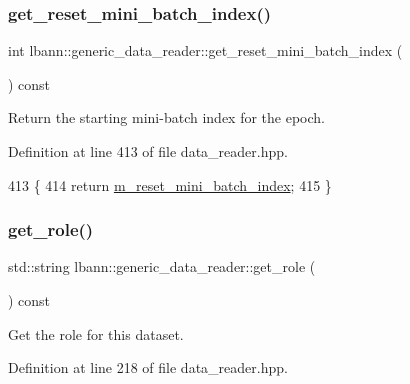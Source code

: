 \subsubsection{\texorpdfstring{get\+\_\+reset\+\_\+mini\+\_\+batch\+\_\+index()}{get\_reset\_mini\_batch\_index()}}
{\footnotesize\ttfamily int lbann\+::generic\+\_\+data\+\_\+reader\+::get\+\_\+reset\+\_\+mini\+\_\+batch\+\_\+index (\begin{DoxyParamCaption}{ }\end{DoxyParamCaption}) const\hspace{0.3cm}{\ttfamily [inline]}}



Return the starting mini-\/batch index for the epoch. 



Definition at line 413 of file data\+\_\+reader.\+hpp.


\begin{DoxyCode}
413                                          \{
414     \textcolor{keywordflow}{return} \hyperlink{classlbann_1_1generic__data__reader_af29f62579a408d1548a124442bcf181d}{m\_reset\_mini\_batch\_index};
415   \}
\end{DoxyCode}
\mbox{\label{classlbann_1_1generic__data__reader_a92982e1b399f37e2ead5aa440883cba5}} 
\subsubsection{\texorpdfstring{get\+\_\+role()}{get\_role()}}
{\footnotesize\ttfamily std\+::string lbann\+::generic\+\_\+data\+\_\+reader\+::get\+\_\+role (\begin{DoxyParamCaption}{ }\end{DoxyParamCaption}) const\hspace{0.3cm}{\ttfamily [inline]}}

Get the role for this dataset. 

Definition at line 218 of file data\+\_\+reader.\+hpp.


